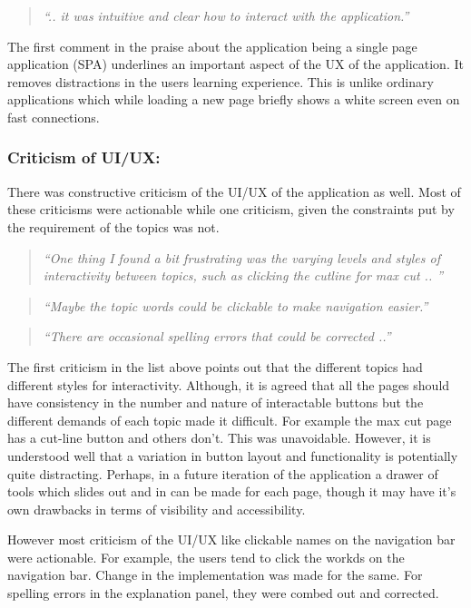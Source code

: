 \begin{quote}
\emph{``.. it was intuitive and clear how to
      interact with the application.''}
\end{quote}


The first comment in the praise about the application being a single page
application (SPA) underlines an important aspect of the UX of the application.
It removes distractions in the users learning experience. This is unlike
ordinary applications which while loading a new page briefly shows a white
screen even on fast connections.


\subsubsection{Criticism of UI/UX:}
There was constructive criticism of the UI/UX of the application as well.
Most of these criticisms were actionable while one criticism, given the
constraints put by the requirement of the topics was not.


\begin{quote}
\emph{``One thing I found a bit frustrating was the varying levels and styles of
interactivity between topics, such as clicking the cutline for max cut .. ''}
\end{quote}

\begin{quote}
\emph{``Maybe the topic words could be clickable to make navigation easier.''}
\end{quote}

\begin{quote}
\emph{``There are occasional spelling errors that
   could be corrected ..'' }
\end{quote}

The first criticism in the list above points out that the different topics had
different styles for interactivity.  Although, it is agreed that all the pages
should have consistency in the number and nature of interactable buttons
but the different demands of each topic made it difficult.  For example the max
cut page has a cut-line button and others don't. This was unavoidable.
However, it is understood well that a variation in button layout and
functionality is potentially quite distracting. Perhaps, in a future iteration
of the application a drawer of tools which slides out and in can be made for
each page, though it may have it's own drawbacks in terms of visibility and
accessibility.

However most criticism of the UI/UX like clickable names on the navigation bar
were actionable.  For example, the users tend to click the workds on the
navigation bar. Change in the implementation was made for the same. For
spelling errors in the explanation panel, they were combed out and corrected.


